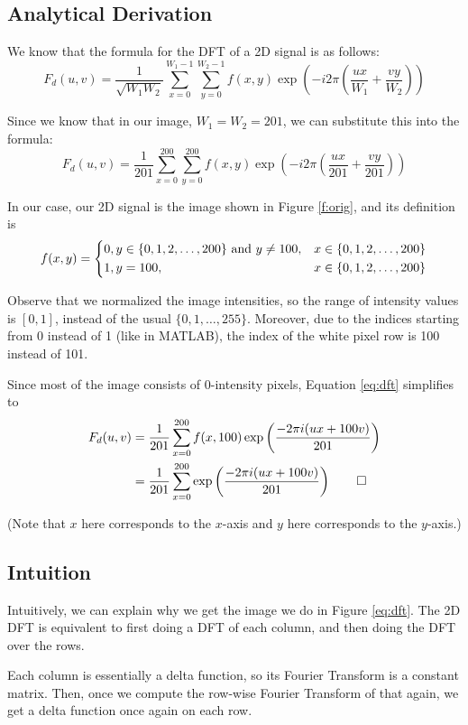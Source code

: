 \documentclass[a4paper]{article}
\begin{document}
\subsection{Analytical Derivation}

We know that the formula for the DFT of a 2D signal is as follows:
\begin{equation*}
F_d(u, v) = \dfrac{1}{\sqrt{W_1W_2}} \sum\limits_{x = 0}^{W_1 - 1} \sum\limits_{y = 0}^{W_2 - 1} f(x, y) \exp\left (-i2\pi \left (\dfrac{ux}{W_1} + \dfrac{vy}{W_2}\right )\right )
\end{equation*}

Since we know that in our image, $W_1 = W_2 = 201$, we can substitute this into the formula:
\begin{equation}
F_d(u, v) = \dfrac{1}{201} \sum\limits_{x = 0}^{200} \sum\limits_{y = 0}^{200} f(x, y) \exp\left (-i2\pi \left (\dfrac{ux}{201} + \dfrac{vy}{201}\right )\right )
\label{eq:dft}
\end{equation}

In our case, our 2D signal is the image shown in Figure \ref{f:orig}, and its definition is
\begin{equation*}
f(x, y) =
\begin{dcases}
0, y \in \{0, 1, 2, \dots, 200\} \text{ and } y \ne 100, & x \in \{0, 1, 2, \dots, 200\} \\
1, y = 100, & x \in \{0, 1, 2, \dots, 200\}
\end{dcases}
\end{equation*}

Observe that we normalized the image intensities, so the range of intensity values is $[0, 1]$, instead of the usual $\{0, 1, \dots, 255\}$. Moreover, due to the indices starting from 0 instead of 1 (like in MATLAB), the index of the white pixel row is 100 instead of 101.

\medskip

Since most of the image consists of 0-intensity pixels, Equation \eqref{eq:dft} simplifies to
\begin{align*}
F_d(u, v) &= \dfrac{1}{201} \sum\limits_{x = 0}^{200} f(x, 100) \exp\left (\dfrac{-2\pi i(ux + 100v)}{201}\right ) \nonumber \\
&= \dfrac{1}{201} \sum\limits_{x = 0}^{200} \exp\left (\dfrac{-2\pi i(ux + 100v)}{201}\right ) \qed
\end{align*}

(Note that $x$ here corresponds to the $x$-axis and $y$ here corresponds to the $y$-axis.)

\subsection{Intuition}

Intuitively, we can explain why we get the image we do in Figure \ref{eq:dft}. The 2D DFT is equivalent to first doing a DFT of each column, and then doing the DFT over the rows.

Each column is essentially a delta function, so its Fourier Transform is a constant matrix. Then, once we compute the row-wise Fourier Transform of that again, we get a delta function once again on each row.
\end{document}
